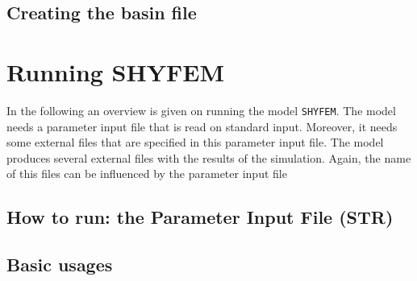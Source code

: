 \documentclass{report}
\newcommand{\shy}{{\tt SHYFEM}}
\newcommand{\todo}[1]{This section still has to be written by #1}
\begin{document}


	\section{Creating the basin file}
	



\chapter{Running SHYFEM}


In the following an overview is given on running the model
\shy{}. The model needs a parameter input file that is read 
on standard input. Moreover, it needs some external files that
are specified in this parameter input file. The model produces
several external files with the results of the simulation. Again,
the name of this files can be influenced by the parameter input file

\section{How to run: the Parameter Input File (STR)}




\section{Basic usages}
\end{document}

